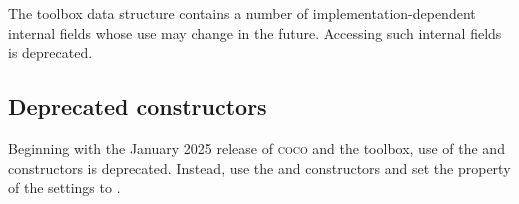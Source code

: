 The  toolbox data structure contains a number of implementation-dependent internal fields whose use may change in the future. Accessing such internal fields is deprecated.

\subsection{Deprecated constructors}
Beginning with the January 2025 release of \textsc{coco} and the  toolbox, use of the  and  constructors is deprecated. Instead, use the  and  constructors and set the  property of the  settings to .
